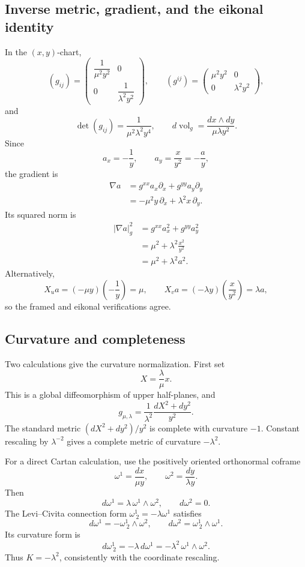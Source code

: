 \subsection{Inverse metric, gradient, and the eikonal identity}

In the \((x,y)\)-chart,
\[
 (g_{ij})
 =
 \begin{pmatrix}
  \dfrac1{\mu^2y^2}&0\\[5pt]
  0&\dfrac1{\lambda^2y^2}
 \end{pmatrix},
 \qquad
 (g^{ij})
 =
 \begin{pmatrix}
  \mu^2y^2&0\\
  0&\lambda^2y^2
 \end{pmatrix},
\]
and
\[
 \det(g_{ij})=\frac1{\mu^2\lambda^2y^4},
 \qquad
 d\operatorname{vol}_g
 =\frac{dx\wedge dy}{\mu\lambda y^2}.
\]
Since
\[
 a_x=-\frac1y,
 \qquad
 a_y=\frac{x}{y^2}=-\frac ay,
\]
the gradient is
\begin{align*}
 \nabla a
 &=g^{xx}a_x\partial_x+g^{yy}a_y\partial_y\\
 &=-\mu^2y\,\partial_x+\lambda^2x\,\partial_y.
\end{align*}
Its squared norm is
\begin{align*}
 |\nabla a|_g^2
 &=g^{xx}a_x^2+g^{yy}a_y^2\\
 &=\mu^2+\lambda^2\frac{x^2}{y^2}\\
 &=\mu^2+\lambda^2a^2.
\end{align*}
Alternatively,
\[
 X_u a=(-\mu y)\left(-\frac1y\right)=\mu,
 \qquad
 X_v a=(-\lambda y)\left(\frac{x}{y^2}\right)=\lambda a,
\]
so the framed and eikonal verifications agree.

\subsection{Curvature and completeness}

Two calculations give the curvature normalization.  First set
\[
 X=\frac{\lambda}{\mu}x.
\]
This is a global diffeomorphism of upper half-planes, and
\[
 g_{\mu,\lambda}
 =\frac1{\lambda^2}
  \frac{dX^2+dy^2}{y^2}.
\]
The standard metric \((dX^2+dy^2)/y^2\) is complete with curvature
\(-1\).  Constant rescaling by \(\lambda^{-2}\) gives a complete metric
of curvature \(-\lambda^2\).

For a direct Cartan calculation, use the positively oriented orthonormal coframe
\[
 \omega^1=\frac{dx}{\mu y},
 \qquad
 \omega^2=\frac{dy}{\lambda y}.
\]
Then
\[
 d\omega^1=\lambda\,\omega^1\wedge\omega^2,
 \qquad
 d\omega^2=0.
\]
The Levi--Civita connection form
\(\omega^1_{\ 2}=-\lambda\omega^1\) satisfies
\[
 d\omega^1=-\omega^1_{\ 2}\wedge\omega^2,
 \qquad
 d\omega^2=\omega^1_{\ 2}\wedge\omega^1.
\]
Its curvature form is
\[
 d\omega^1_{\ 2}
 =-\lambda\,d\omega^1
 =-\lambda^2\,\omega^1\wedge\omega^2.
\]
Thus \(K=-\lambda^2\), consistently with the coordinate rescaling.

